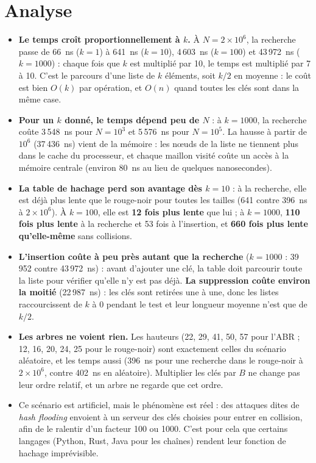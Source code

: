 \documentclass[12pt,a4paper]{report}
\begin{document}
\section{Analyse}
\begin{itemize}
  \item \textbf{Le temps croît proportionnellement à $k$.} À $N = 2\times10^6$, la recherche passe de 66~ns ($k=1$) à 641~ns ($k=10$), 4\,603~ns ($k=100$) et 43\,972~ns ($k=1000$) : chaque fois que $k$ est multiplié par 10, le temps est multiplié par 7 à 10. C'est le parcours d'une liste de $k$ éléments, soit $k/2$ en moyenne : le coût est bien $O(k)$ par opération, et $O(n)$ quand toutes les clés sont dans la même case.
  \item \textbf{Pour un $k$ donné, le temps dépend peu de $N$} : à $k = 1000$, la recherche coûte 3\,548~ns pour $N = 10^3$ et 5\,576~ns pour $N = 10^5$. La hausse à partir de $10^6$ (37\,436~ns) vient de la mémoire : les nœuds de la liste ne tiennent plus dans le cache du processeur, et chaque maillon visité coûte un accès à la mémoire centrale (environ 80~ns au lieu de quelques nanosecondes).
  \item \textbf{La table de hachage perd son avantage dès $k = 10$} : à la recherche, elle est déjà plus lente que le rouge-noir pour toutes les tailles (641 contre 396~ns à $2\times10^6$). À $k = 100$, elle est \textbf{12 fois plus lente} que lui ; à $k = 1000$, \textbf{110 fois plus lente} à la recherche et 53 fois à l'insertion, et \textbf{660 fois plus lente qu'elle-même} sans collisions.
  \item \textbf{L'insertion coûte à peu près autant que la recherche} ($k = 1000$ : 39\,952 contre 43\,972~ns) : avant d'ajouter une clé, la table doit parcourir toute la liste pour vérifier qu'elle n'y est pas déjà. \textbf{La suppression coûte environ la moitié} (22\,987~ns) : les clés sont retirées une à une, donc les listes raccourcissent de $k$ à 0 pendant le test et leur longueur moyenne n'est que de $k/2$.
  \item \textbf{Les arbres ne voient rien.} Les hauteurs (22, 29, 41, 50, 57 pour l'ABR ; 12, 16, 20, 24, 25 pour le rouge-noir) sont exactement celles du scénario aléatoire, et les temps aussi (396~ns pour une recherche dans le rouge-noir à $2\times10^6$, contre 402~ns en aléatoire). Multiplier les clés par $B$ ne change pas leur ordre relatif, et un arbre ne regarde que cet ordre.
  \item Ce scénario est artificiel, mais le phénomène est réel : des attaques dites de \emph{hash flooding} envoient à un serveur des clés choisies pour entrer en collision, afin de le ralentir d'un facteur 100 ou 1000. C'est pour cela que certains langages (Python, Rust, Java pour les chaînes) rendent leur fonction de hachage imprévisible.
\end{itemize}
\end{document}
